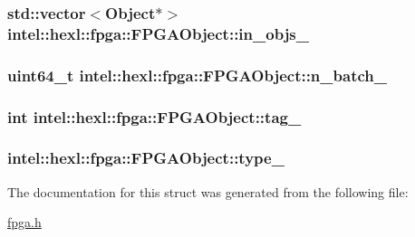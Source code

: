 \hypertarget{structintel_1_1hexl_1_1fpga_1_1FPGAObject_a51ecca2b08e9e9d67036d8419acca68b}{
\subsubsection[{in\-\_\-objs\-\_\-}]{\setlength{\rightskip}{0pt plus 5cm}std\-::vector$<${\bf Object}$\ast$$>$ intel\-::hexl\-::fpga\-::\-F\-P\-G\-A\-Object\-::in\-\_\-objs\-\_\-}}\label{structintel_1_1hexl_1_1fpga_1_1FPGAObject_a51ecca2b08e9e9d67036d8419acca68b}
\hypertarget{structintel_1_1hexl_1_1fpga_1_1FPGAObject_a350704607558ab455334aebe055fc2d4}{
\subsubsection[{n\-\_\-batch\-\_\-}]{\setlength{\rightskip}{0pt plus 5cm}uint64\-\_\-t intel\-::hexl\-::fpga\-::\-F\-P\-G\-A\-Object\-::n\-\_\-batch\-\_\-}}\label{structintel_1_1hexl_1_1fpga_1_1FPGAObject_a350704607558ab455334aebe055fc2d4}
\hypertarget{structintel_1_1hexl_1_1fpga_1_1FPGAObject_a246901212706cfac8299f3b47419f33f}{
\subsubsection[{tag\-\_\-}]{\setlength{\rightskip}{0pt plus 5cm}int intel\-::hexl\-::fpga\-::\-F\-P\-G\-A\-Object\-::tag\-\_\-}}\label{structintel_1_1hexl_1_1fpga_1_1FPGAObject_a246901212706cfac8299f3b47419f33f}
\hypertarget{structintel_1_1hexl_1_1fpga_1_1FPGAObject_a6be51c4052a667f067326880474dfe97}{
\subsubsection[{type\-\_\-}]{ intel\-::hexl\-::fpga\-::\-F\-P\-G\-A\-Object\-::type\-\_\-}}\label{structintel_1_1hexl_1_1fpga_1_1FPGAObject_a6be51c4052a667f067326880474dfe97}


The documentation for this struct was generated from the following file\-:\begin{DoxyCompactItemize}
\item 
\hyperlink{fpga_8h}{fpga.\-h}\end{DoxyCompactItemize}
